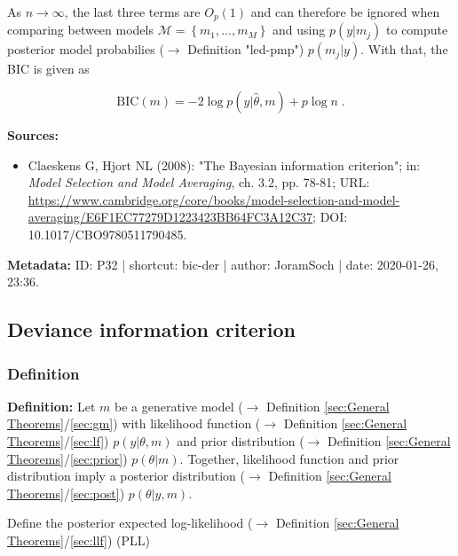 \documentclass[a4paper,12pt,twoside]{book}
\begin{document}
As $n \to \infty$, the last three terms are $O_p(1)$ and can therefore be ignored when comparing between models $\mathcal{M} = \left\lbrace m_1, \ldots, m_M \right\rbrace$ and using $p(y \vert m_j)$ to compute posterior model probabilies ($\rightarrow$ Definition "led-pmp") $p(m_j \vert y)$. With that, the BIC is given as

\begin{equation} \label{eq:bic-der-BIC-qed}
\mathrm{BIC}(m) = -2 \log p(y|\hat{\theta}, m) + p \log n \; .
\end{equation}


\vspace{1em}
\textbf{Sources:}
\begin{itemize}
\item Claeskens G, Hjort NL (2008): "The Bayesian information criterion"; in: \textit{Model Selection and Model Averaging}, ch. 3.2, pp. 78-81; URL: \url{https://www.cambridge.org/core/books/model-selection-and-model-averaging/E6F1EC77279D1223423BB64FC3A12C37}; DOI: 10.1017/CBO9780511790485.
\end{itemize}


\vspace{1em}
\textbf{Metadata:} ID: P32 | shortcut: bic-der | author: JoramSoch | date: 2020-01-26, 23:36.
\vspace{1em}



\subsection{Deviance information criterion}

\subsubsection[\textit{Definition}]{Definition} \label{sec:dic}
\setcounter{equation}{0}

\textbf{Definition:} Let $m$ be a generative model ($\rightarrow$ Definition \ref{sec:General Theorems}/\ref{sec:gm}) with likelihood function ($\rightarrow$ Definition \ref{sec:General Theorems}/\ref{sec:lf}) $p(y \vert \theta, m)$ and prior distribution ($\rightarrow$ Definition \ref{sec:General Theorems}/\ref{sec:prior}) $p(\theta \vert m)$. Together, likelihood function and prior distribution imply a posterior distribution ($\rightarrow$ Definition \ref{sec:General Theorems}/\ref{sec:post}) $p(\theta \vert y, m)$.

Define the posterior expected log-likelihood ($\rightarrow$ Definition \ref{sec:General Theorems}/\ref{sec:llf}) (PLL)
\end{document}
